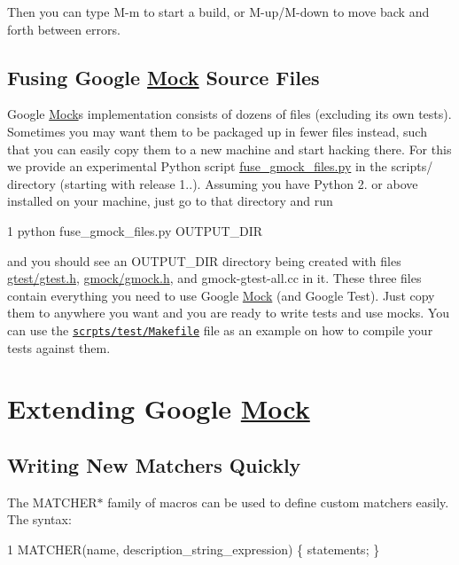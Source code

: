 Then you can type {\ttfamily M-\/m} to start a build, or {\ttfamily M-\/up}/{\ttfamily M-\/down} to move back and forth between errors.

\subsection*{Fusing Google \hyperlink{classMock}{Mock} Source Files}

Google \hyperlink{classMock}{Mock}\textquotesingle{}s implementation consists of dozens of files (excluding its own tests). Sometimes you may want them to be packaged up in fewer files instead, such that you can easily copy them to a new machine and start hacking there. For this we provide an experimental Python script {\ttfamily \hyperlink{fuse__gmock__files_8py}{fuse\+\_\+gmock\+\_\+files.\+py}} in the {\ttfamily scripts/} directory (starting with release 1..). Assuming you have Python 2. or above installed on your machine, just go to that directory and run 
\begin{DoxyCode}
1 python fuse\_gmock\_files.py OUTPUT\_DIR
\end{DoxyCode}


and you should see an {\ttfamily O\+U\+T\+P\+U\+T\+\_\+\+D\+IR} directory being created with files {\ttfamily \hyperlink{gtest_8h}{gtest/gtest.\+h}}, {\ttfamily \hyperlink{gmock_8h}{gmock/gmock.\+h}}, and {\ttfamily gmock-\/gtest-\/all.\+cc} in it. These three files contain everything you need to use Google \hyperlink{classMock}{Mock} (and Google Test). Just copy them to anywhere you want and you are ready to write tests and use mocks. You can use the \href{http://code.google.com/p/googlemock/source/browse/trunk/scripts/test/Makefile}{\tt scrpts/test/\+Makefile} file as an example on how to compile your tests against them.

\section*{Extending Google \hyperlink{classMock}{Mock}}

\subsection*{Writing New Matchers Quickly}

The {\ttfamily M\+A\+T\+C\+H\+E\+R$\ast$} family of macros can be used to define custom matchers easily. The syntax\+:


\begin{DoxyCode}
1 MATCHER(name, description\_string\_expression) \{ statements; \}
\end{DoxyCode}


